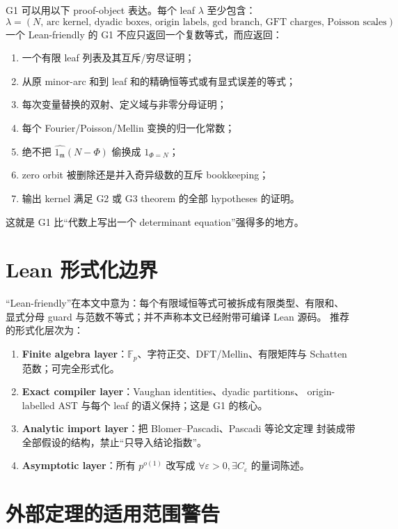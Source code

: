 \documentclass[11pt,a4paper]{ctexart}
\theoremstyle{definition}
\newcommand{\F}{\mathbb F}
\newcommand{\eps}{\varepsilon}
\begin{document}
G1 可以用以下 proof-object 表达。每个 leaf $\lambda$ 至少包含：
\[
\lambda=(N,\,\text{arc kernel},\,\text{dyadic boxes},\,
\text{origin labels},\,\text{gcd branch},\,\text{GFT charges},\,
\text{Poisson scales}).
\]
一个 Lean-friendly 的 G1 不应只返回一个复数等式，而应返回：
\begin{enumerate}[label=\textup{(G1-\arabic*)}]
\item 一个有限 leaf 列表及其互斥/穷尽证明；
\item 从原 minor-arc 和到 leaf 和的精确恒等式或有显式误差的等式；
\item 每次变量替换的双射、定义域与非零分母证明；
\item 每个 Fourier/Poisson/Mellin 变换的归一化常数；
\item 绝不把 $\widehat{1_{\mathfrak m}}(N-\Phi)$ 偷换成 $1_{\Phi=N}$；
\item zero orbit 被删除还是并入奇异级数的互斥 bookkeeping；
\item 输出 kernel 满足 G2 或 G3 theorem 的全部 hypotheses 的证明。
\end{enumerate}
这就是 G1 比“代数上写出一个 determinant equation”强得多的地方。

\section{Lean 形式化边界}

“Lean-friendly”在本文中意为：每个有限域恒等式可被拆成有限类型、有限和、
显式分母 guard 与范数不等式；并不声称本文已经附带可编译 Lean 源码。
推荐的形式化层次为：
\begin{enumerate}
\item \textbf{Finite algebra layer}：$\F_p$、字符正交、DFT/Mellin、有限矩阵与
Schatten 范数；可完全形式化。
\item \textbf{Exact compiler layer}：Vaughan identities、dyadic partitions、
origin-labelled AST 与每个 leaf 的语义保持；这是 G1 的核心。
\item \textbf{Analytic import layer}：把 Blomer--Pascadi、Pascadi 等论文定理
封装成带全部假设的结构，禁止“只导入结论指数”。
\item \textbf{Asymptotic layer}：所有 $p^{o(1)}$ 改写成
$\forall\eps>0,\exists C_\eps$ 的量词陈述。
\end{enumerate}

\section{外部定理的适用范围警告}
\end{document}
